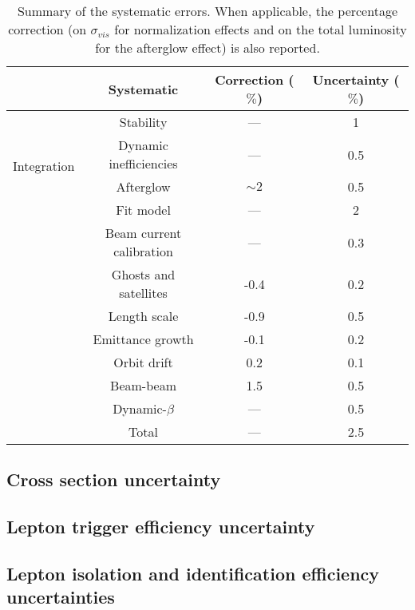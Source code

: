 \begin{table*}[!htbp]
\centering
\caption{Summary of the systematic errors. When applicable, the percentage correction 
(on $\sigma_{vis}$ for normalization effects and on the total luminosity for the afterglow effect) 
is also reported\label{tab:systematics}.}
\label{tab:LuminosityMeasurementUncertainties}
\begin{tabular}{c|c|c|c}
\hline \hline
& Systematic & Correction ($\%$) & Uncertainty ($\%$) \\
\hline \hline 
\multirow{4}{*}{Integration} & Stability & --- & 1 \\ %
& Dynamic inefficiencies & --- & 0.5 \\ %
& Afterglow & $\sim2$ & 0.5 \\ %
\hline 
\multirow{8}{*}{Normalization} & Fit model & --- & 2 \\ %
& Beam current calibration & --- & 0.3 \\ %
& Ghosts and satellites & -0.4 & 0.2 \\ %
& Length scale & -0.9 & 0.5 \\ %
& Emittance growth & -0.1 & 0.2 \\ %
& Orbit drift & 0.2 & 0.1 \\ %
& Beam-beam & 1.5 & 0.5\\ %
& Dynamic-$\beta$ & --- &  0.5 \\ 
\hline 
& Total & --- & 2.5 \\
\hline \hline
\end{tabular}
\end{table*}


\subsection*{Cross section uncertainty}


\subsection*{Lepton trigger efficiency uncertainty}
\label{sec:LeptonTriggerEfficiencyUncertainty}


\subsection*{Lepton isolation and identification efficiency uncertainties}
\label{LeptonEfficiencyUncertainty}



